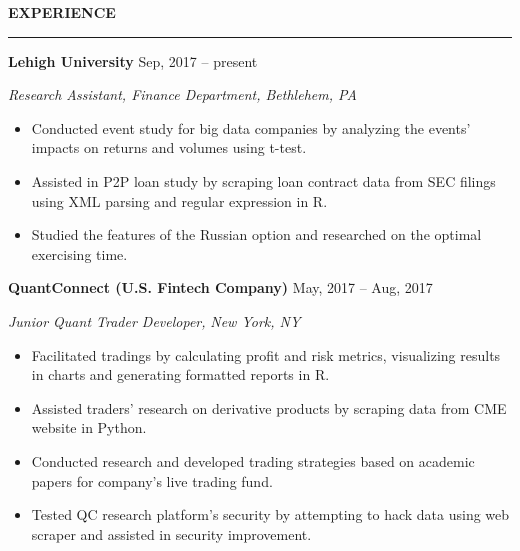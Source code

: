 \documentclass[a4paper,12pt]{report}
\newcommand{\marginAdj}{0.5in}
\begin{document}
\noindent 
\textbf{EXPERIENCE} \par
\vspace{2pt}
\hrule
\vspace{6pt}

\noindent 
\textbf{Lehigh University}{\fontsize{9pt}{9pt}\selectfont  \hspace*{4.3in} \hspace*{\marginAdj} {\fontsize{10pt}{10pt}\selectfont Sep, 2017 – present}} \par
\noindent 
{\fontsize{10pt}{10pt}\selectfont \textit{Research Assistant, Finance Department, Bethlehem, PA}} \par
\noindent 
\begin{itemize}[noitemsep,topsep=0pt]
	\item {\fontsize{10pt}{10pt}\selectfont Conducted event study for big data companies by analyzing the events' impacts on returns and volumes using t-test.} \par
	\noindent 
	\item {\fontsize{10pt}{10pt}\selectfont Assisted in P2P loan study by scraping loan contract data from SEC filings using XML parsing and regular expression in R.} \par
	\noindent 
	\item {\fontsize{10pt}{10pt}\selectfont Studied the features of the Russian option and researched on the optimal exercising time.} \par
\end{itemize}

\noindent 
\textbf{QuantConnect (U.S. Fintech Company)}{\fontsize{9pt}{9pt}\selectfont  \hspace*{2.65in} \hspace*{\marginAdj}  {\fontsize{10pt}{10pt}\selectfont May, 2017 – Aug, 2017}} \par
\noindent 
{\fontsize{10pt}{10pt}\selectfont \textit{Junior Quant Trader Developer}\textit{, }\textit{New York}\textit{, NY}} \par
\noindent 
\begin{itemize}[noitemsep,topsep=0pt]
\item {\fontsize{10pt}{10pt}\selectfont Facilitated tradings by calculating profit and risk metrics, visualizing results in charts and generating formatted reports in R.} \par
\noindent 
\item {\fontsize{10pt}{10pt}\selectfont Assisted traders' research on derivative products by scraping data from CME website in Python. } \par
\noindent 
\item {\fontsize{10pt}{10pt}\selectfont Conducted research and developed trading strategies based on academic papers for company’s live trading fund.} \par
\item {\fontsize{10pt}{10pt}\selectfont Tested QC research platform's security by attempting to hack data using web scraper and assisted in security improvement.} \par
\noindent 
\end{itemize}
\end{document}
